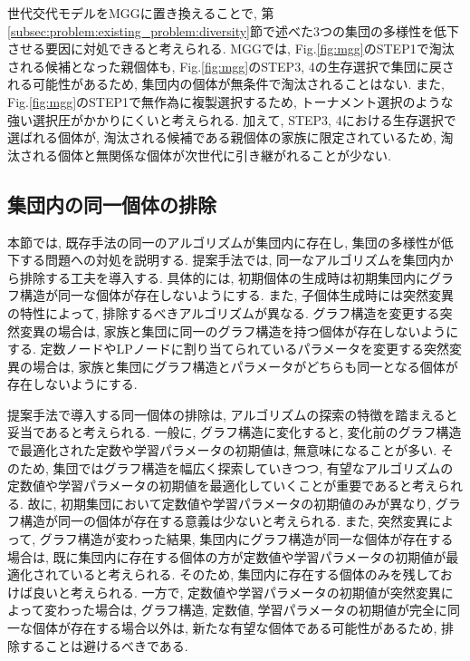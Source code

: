 \documentclass[11pt,oneside,openany,report]{jsbook}
\begin{document}
世代交代モデルをMGGに置き換えることで, 第\ref{subsec:problem:existing_problem:diversity}節で述べた3つの集団の多様性を低下させる要因に対処できると考えられる. MGGでは, Fig.\ref{fig:mgg}のSTEP1で淘汰される候補となった親個体も, Fig.\ref{fig:mgg}のSTEP3, 4の生存選択で集団に戻される可能性があるため, 集団内の個体が無条件で淘汰されることはない. また, Fig.\ref{fig:mgg}のSTEP1で無作為に複製選択するため, トーナメント選択のような強い選択圧がかかりにくいと考えられる. 加えて, STEP3, 4における生存選択で選ばれる個体が, 淘汰される候補である親個体の家族に限定されているため, 淘汰される個体と無関係な個体が次世代に引き継がれることが少ない.

\subsection{集団内の同一個体の排除}
本節では, 既存手法の同一のアルゴリズムが集団内に存在し, 集団の多様性が低下する問題への対処を説明する. 提案手法では, 同一なアルゴリズムを集団内から排除する工夫を導入する. 具体的には, 初期個体の生成時は初期集団内にグラフ構造が同一な個体が存在しないようにする. また, 子個体生成時には突然変異の特性によって, 排除するべきアルゴリズムが異なる. グラフ構造を変更する突然変異の場合は, 家族と集団に同一のグラフ構造を持つ個体が存在しないようにする. 定数ノードやLPノードに割り当てられているパラメータを変更する突然変異の場合は, 家族と集団にグラフ構造とパラメータがどちらも同一となる個体が存在しないようにする.

提案手法で導入する同一個体の排除は, アルゴリズムの探索の特徴を踏まえると妥当であると考えられる. 一般に, グラフ構造に変化すると, 変化前のグラフ構造で最適化された定数や学習パラメータの初期値は, 無意味になることが多い. そのため, 集団ではグラフ構造を幅広く探索していきつつ, 有望なアルゴリズムの定数値や学習パラメータの初期値を最適化していくことが重要であると考えられる. 故に, 初期集団において定数値や学習パラメータの初期値のみが異なり, グラフ構造が同一の個体が存在する意義は少ないと考えられる. また, 突然変異によって, グラフ構造が変わった結果, 集団内にグラフ構造が同一な個体が存在する場合は, 既に集団内に存在する個体の方が定数値や学習パラメータの初期値が最適化されていると考えられる. そのため, 集団内に存在する個体のみを残しておけば良いと考えられる. 一方で, 定数値や学習パラメータの初期値が突然変異によって変わった場合は, グラフ構造, 定数値, 学習パラメータの初期値が完全に同一な個体が存在する場合以外は, 新たな有望な個体である可能性があるため, 排除することは避けるべきである.
\end{document}
